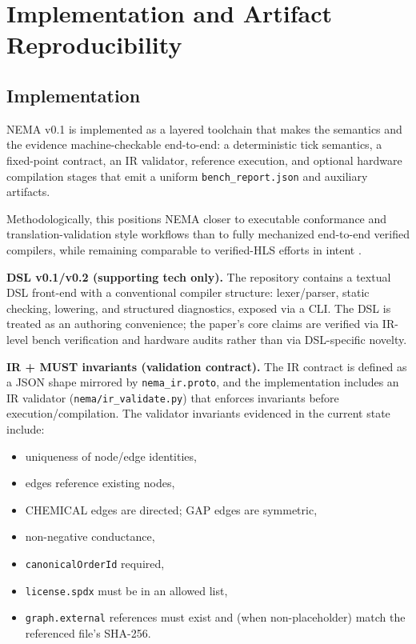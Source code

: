 \section{Implementation and Artifact Reproducibility}

\subsection{Implementation}

NEMA v0.1 is implemented as a layered toolchain that makes the semantics and the evidence machine-checkable end-to-end: a deterministic tick semantics, a fixed-point contract, an IR validator, reference execution, and optional hardware compilation stages that emit a uniform \texttt{bench\_report.json} and auxiliary artifacts.

Methodologically, this positions NEMA closer to executable conformance and translation-validation style workflows \cite{LopesPLDI2021Alive2,PnueliTACAS1998TranslationValidation} than to fully mechanized end-to-end verified compilers, while remaining comparable to verified-HLS efforts in intent \cite{HerklotzOOPSLA2021Vericert,HerklotzPLDI2024Hyperblock}.

\textbf{DSL v0.1/v0.2 (supporting tech only).}
The repository contains a textual DSL front-end with a conventional compiler structure: lexer/parser, static checking, lowering, and structured diagnostics, exposed via a CLI. The DSL is treated as an authoring convenience; the paper's core claims are verified via IR-level bench verification and hardware audits rather than via DSL-specific novelty.

\textbf{IR + MUST invariants (validation contract).}
The IR contract is defined as a JSON shape mirrored by \texttt{nema\_ir.proto}, and the implementation includes an IR validator (\texttt{nema/ir\_validate.py}) that enforces invariants before execution/compilation. The validator invariants evidenced in the current state include:
\begin{itemize}
\item uniqueness of node/edge identities,
\item edges reference existing nodes,
\item CHEMICAL edges are directed; GAP edges are symmetric,
\item non-negative conductance,
\item \texttt{canonicalOrderId} required,
\item \texttt{license.spdx} must be in an allowed list,
\item \texttt{graph.external} references must exist and (when non-placeholder) match the referenced file's SHA-256.
\end{itemize}


